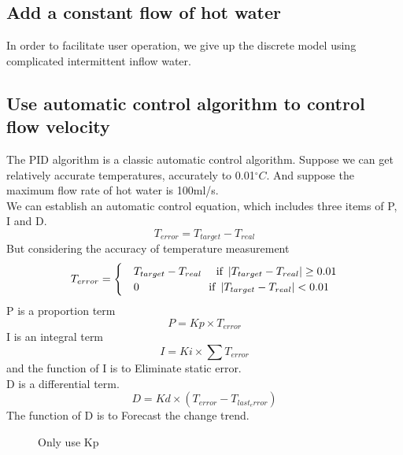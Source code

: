 \documentclass{mcmthesis}
\begin{document}
\subsection{Add a constant flow of hot water}
In order to facilitate user operation, we give up the discrete model using complicated intermittent inflow water.
\subsection{Use automatic control algorithm to control flow velocity}
The PID algorithm is a classic automatic control algorithm. Suppose we can get relatively accurate temperatures, accurately to 0.01$^{\circ}C$. And suppose the maximum flow rate of hot water is 100ml/s.\\
\indent We can establish an automatic control equation, which includes three items of P, I and D.\\
\begin{equation}
T_{error}=T_{target}-T_{real}
\end{equation}
\indent But considering the accuracy of temperature measurement\\
\begin{equation}
	T_{error}=\begin{cases}
	&T_{target}-T_{real} \quad\text{ if }\left | T_{target}-T_{real} \right |\geq 0.01 \\ 
	&0\indent\indent\indent\indent \text{ if } \left | T_{target}-T_{real} \right |<0.01 
	\end{cases}
\end{equation}
\indent P is a proportion term
\begin{equation}
	P=Kp\times T_{error}
\end{equation}
\indent I is an integral term
\begin{equation}
	I=Ki\times \sum T_{error}
\end{equation}
and the function of I is to Eliminate static error.\\
\indent D is a differential term.
\begin{equation}
D=Kd\times (T_{error}-T_{last_error})
\end{equation}
The function of D is to Forecast the change trend.\\
\begin{figure}[H]
\centering
{}
\caption{Only use Kp}
\label{PID1}
\end{figure}
\end{document}
